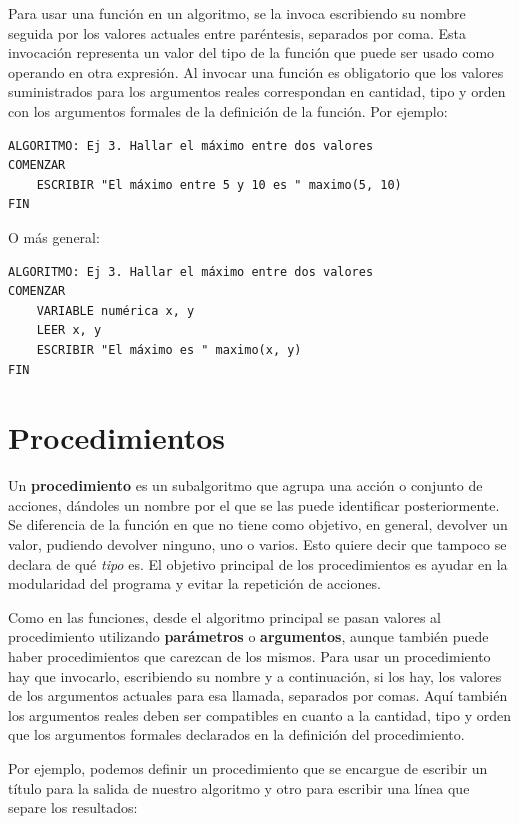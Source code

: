 \documentclass[]{book}
\begin{document}
Para usar una función en un algoritmo, se la invoca escribiendo su
nombre seguida por los valores actuales entre paréntesis, separados por
coma. Esta invocación representa un valor del tipo de la función que
puede ser usado como operando en otra expresión. Al invocar una función
es obligatorio que los valores suministrados para los argumentos reales
correspondan en cantidad, tipo y orden con los argumentos formales de la
definición de la función. Por ejemplo:

\begin{verbatim}
ALGORITMO: Ej 3. Hallar el máximo entre dos valores
COMENZAR
    ESCRIBIR "El máximo entre 5 y 10 es " maximo(5, 10)
FIN
\end{verbatim}

O más general:

\begin{verbatim}
ALGORITMO: Ej 3. Hallar el máximo entre dos valores
COMENZAR
    VARIABLE numérica x, y
    LEER x, y
    ESCRIBIR "El máximo es " maximo(x, y)
FIN
\end{verbatim}

\section{Procedimientos}\label{procedimientos}

Un \textbf{procedimiento} es un subalgoritmo que agrupa una acción o
conjunto de acciones, dándoles un nombre por el que se las puede
identificar posteriormente. Se diferencia de la función en que no tiene
como objetivo, en general, devolver un valor, pudiendo devolver ninguno,
uno o varios. Esto quiere decir que tampoco se declara de qué
\emph{tipo} es. El objetivo principal de los procedimientos es ayudar en
la modularidad del programa y evitar la repetición de acciones.

Como en las funciones, desde el algoritmo principal se pasan valores al
procedimiento utilizando \textbf{parámetros} o \textbf{argumentos},
aunque también puede haber procedimientos que carezcan de los mismos.
Para usar un procedimiento hay que invocarlo, escribiendo su nombre y a
continuación, si los hay, los valores de los argumentos actuales para
esa llamada, separados por comas. Aquí también los argumentos reales
deben ser compatibles en cuanto a la cantidad, tipo y orden que los
argumentos formales declarados en la definición del procedimiento.

Por ejemplo, podemos definir un procedimiento que se encargue de
escribir un título para la salida de nuestro algoritmo y otro para
escribir una línea que separe los resultados:
\end{document}
